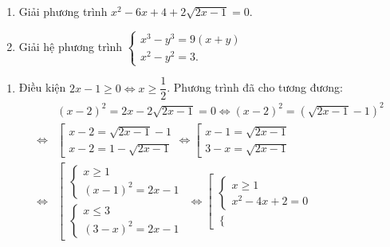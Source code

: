 \begin{ex}%
	\hfill
    \begin{enumerate}    
        \item Giải phương trình $x^2 - 6x + 4 + 2\sqrt {2x - 1}  = 0$.
        \item Giải hệ phương trình $\left\{ \begin{array}{l}
        x^3 - y^3 = 9(x + y)\\
        x^2 - y^2 = 3.
        \end{array} \right.$
    \end{enumerate}
\loigiai
    {
    \begin{enumerate}
        \item Điều kiện $2x - 1 \ge 0 \Leftrightarrow x \ge \dfrac{1}{2}$. Phương trình đã cho tương đương:
 {\allowdisplaybreaks
 \begin{align*}
 &\left( x - 2 \right)^2 = 2x - 2\sqrt {2x - 1}  = 0 \Leftrightarrow \left( x - 2 \right)^2 = \left( \sqrt {2x - 1}  - 1 \right)^2\\
 \Leftrightarrow& \left[ \begin{array}{l}
 x - 2 = \sqrt {2x - 1}  - 1\\
 x - 2 = 1 - \sqrt {2x - 1} 
 \end{array} \right. \Leftrightarrow \left[ \begin{array}{l}
 x - 1 = \sqrt {2x - 1} \\
 3 - x = \sqrt {2x - 1} 
 \end{array} \right.\\
 \Leftrightarrow& \left[ \begin{array}{l}
 \left\{ \begin{array}{l}
 x \ge 1\\
 (x - 1)^2 = 2x - 1
 \end{array} \right.\\
 \left\{ \begin{array}{l}
 x \le 3\\
 (3 - x)^2 = 2x - 1
 \end{array} \right.
 \end{array} \right. \Leftrightarrow \left[ \begin{array}{l}
 \left\{ \begin{array}{l}
 x \ge 1\\
 x^2 - 4x + 2 = 0
 \end{array} \right.\\
 \left\{ \begin{array}{l}

\end{array}
\end{array}
\end{align*}}
\end{enumerate}}
\end{ex}
